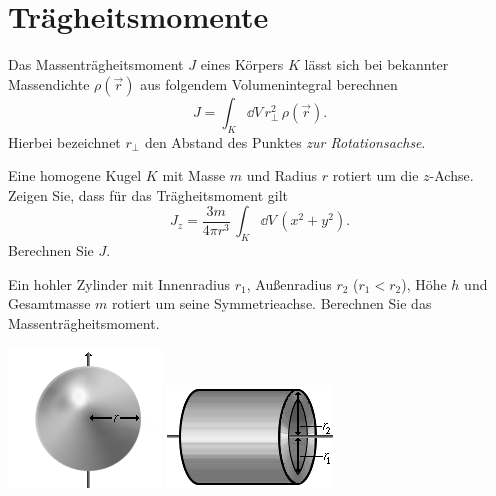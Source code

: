 \documentclass{scrartcl}
\begin{document}
\section{Trägheitsmomente }
\label{sec:tr_gheitsmomente}

Das Massenträgheitsmoment $J$ eines Körpers $K$ lässt sich bei bekannter Massendichte $\rho(\vec r)$ aus folgendem Volumenintegral berechnen
\[
  J = \int_K \dd V \, r_\perp^2 \, \rho(\vec r).
\] 
Hierbei bezeichnet $r_\perp$ den Abstand des Punktes \emph{zur Rotationsachse}.

\begin{subex}
  \item{} Eine homogene Kugel $K$ mit Masse $m$ und Radius $r$ rotiert um die $z$-Achse. 
  Zeigen Sie, dass für das Trägheitsmoment gilt
  \[
    J_z = \frac{3 m}{4\pi r^3}\, \int_K \dd V \, (x^2 + y^2). 
  \]
  Berechnen Sie $J$.
  \item{} Ein hohler Zylinder mit Innenradius $r_1$, Außenradius $r_2$ ($r_1 < r_2$), Höhe $h$ und Gesamtmasse $m$ rotiert um seine Symmetrieachse.
  Berechnen Sie das Massenträgheitsmoment.
\end{subex}

\begin{center}
  \includegraphics[width=.3\textwidth]{img/Traegheit_j_kugel1-2.png}
  \hspace{1cm}
  \includegraphics[width=.3\textwidth]{img/Traegheit_d_hohlzylinder2.png}
\end{center}

\let\thefootnote\relax{}
\end{document}
